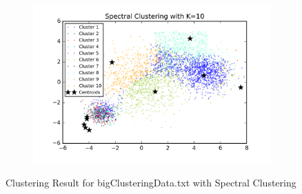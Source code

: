 \begin{figure}[htb]
\begin{subfigure}[b]{0.475\textwidth}
            \includegraphics[width=\textwidth]{./figures/bigClustering_spectral_10.png}
        \end{subfigure}
        
        \caption{Clustering Result for bigClusteringData.txt with Spectral Clustering}
        \label{fig:kmean_clustering}
\end{figure}

